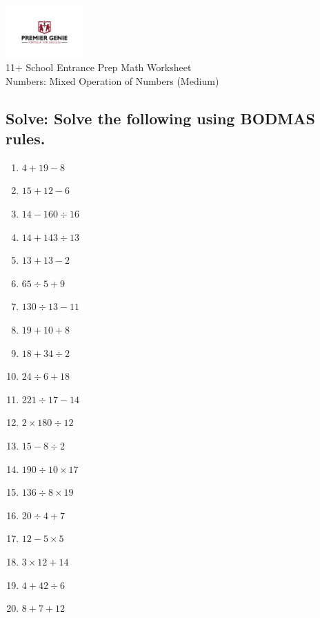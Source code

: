 \documentclass{article}
\begin{document}
\begin{center}
\includegraphics[width=3cm]{PREMGENIEJPG.jpg}\\
{\Large 11+ School Entrance Prep Math Worksheet}\\
{\Medium Numbers: Mixed Operation of Numbers (Medium)}\\

\end{center}

\subsection*{Solve: Solve the following using BODMAS rules.}

\begin{enumerate}
\item $\displaystyle {4}+{19}-{8} $ \ 
\item $\displaystyle {15}+{12}-{6} $ \ 
\item $\displaystyle {14}-160\div{16} $ \ 
\item $\displaystyle {14}+143\div{13} $ \ 
\item $\displaystyle {13}+{13}-{2} $ \ 
\item $\displaystyle 65\div{5}+{9} $ \ 
\item $\displaystyle 130\div{13}-{11} $ \ 
\item $\displaystyle {19}+{10}+{8} $ \ 
\item $\displaystyle {18}+34\div{2} $ \ 
\item $\displaystyle 24\div{6}+{18} $ \ 
\item $\displaystyle 221\div{17}-{14} $ \ 
\item $\displaystyle {2}\times180\div{12} $ \ 
\item $\displaystyle {15}-8\div{2} $ \ 
\item $\displaystyle 190\div{10}\times{17} $ \ 
\item $\displaystyle 136\div{8}\times{19} $ \ 
\item $\displaystyle 20\div{4}+{7} $ \ 
\item $\displaystyle {12}-{5}\times{5} $ \ 
\item $\displaystyle {3}\times{12}+{14} $ \ 
\item $\displaystyle {4}+42\div{6} $ \ 
\item $\displaystyle {8}+{7}+{12} $ \ 


\end{enumerate}
\end{document}
